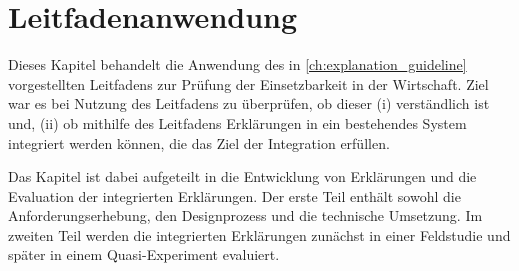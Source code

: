 \chapter{Leitfadenanwendung}
\label{sec:model_evaluation}

Dieses Kapitel behandelt die Anwendung des in \autoref{ch:explanation_guideline} vorgestellten Leitfadens zur Prüfung der Einsetzbarkeit in der Wirtschaft. Ziel war es bei Nutzung des Leitfadens zu überprüfen, ob dieser (i) verständlich ist und, (ii) ob mithilfe des Leitfadens Erklärungen in ein bestehendes System integriert werden können, die das Ziel der Integration erfüllen.

Das Kapitel ist dabei aufgeteilt in die Entwicklung von Erklärungen und die Evaluation der integrierten Erklärungen. Der erste Teil enthält sowohl die Anforderungserhebung, den Designprozess und die technische Umsetzung. Im zweiten Teil werden die integrierten Erklärungen zunächst in einer Feldstudie und später in einem Quasi-Experiment evaluiert.



